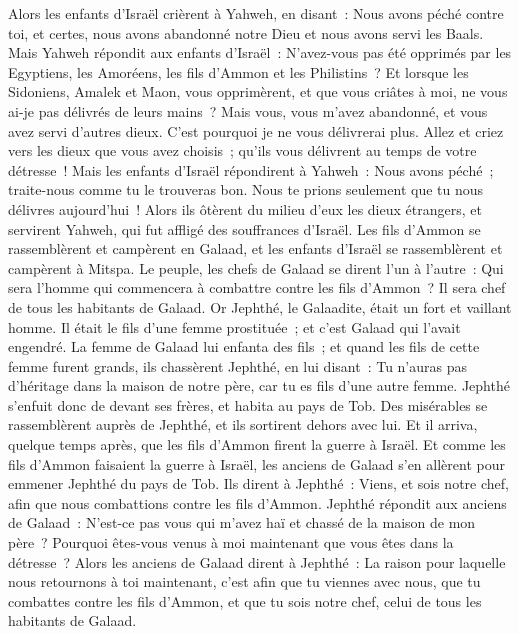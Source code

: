 \begin{multicols}{2}
Alors les enfants d'Israël crièrent à Yahweh, en disant~: Nous avons péché contre toi, et certes, nous avons abandonné notre Dieu et nous avons servi les Baals.
Mais Yahweh répondit aux enfants d'Israël~: N'avez-vous pas été opprimés par les Egyptiens, les Amoréens, les fils d'Ammon et les Philistins~?
Et lorsque les Sidoniens, Amalek et Maon, vous opprimèrent, et que vous criâtes à moi, ne vous ai-je pas délivrés de leurs mains~?
Mais vous, vous m'avez abandonné, et vous avez servi d'autres dieux. C'est pourquoi je ne vous délivrerai plus.
Allez et criez vers les dieux que vous avez choisis~; qu'ils vous délivrent au temps de votre détresse~!
Mais les enfants d'Israël répondirent à Yahweh~: Nous avons péché~; traite-nous comme tu le trouveras bon. Nous te prions seulement que tu nous délivres aujourd'hui~!
Alors ils ôtèrent du milieu d'eux les dieux étrangers, et servirent Yahweh, qui fut affligé des souffrances d'Israël.
Les fils d'Ammon se rassemblèrent et campèrent en Galaad, et les enfants d'Israël se rassemblèrent et campèrent à Mitspa.
Le peuple, les chefs de Galaad se dirent l'un à l'autre~: Qui sera l'homme qui commencera à combattre contre les fils d'Ammon~? Il sera chef de tous les habitants de Galaad.
\VerseOne{}Or Jephthé, le Galaadite, était un fort et vaillant homme. Il était le fils d'une femme prostituée~; et c'est Galaad qui l'avait engendré.
La femme de Galaad lui enfanta des fils~; et quand les fils de cette femme furent grands, ils chassèrent Jephthé, en lui disant~: Tu n'auras pas d'héritage dans la maison de notre père, car tu es fils d'une autre femme.
Jephthé s'enfuit donc de devant ses frères, et habita au pays de Tob. Des misérables se rassemblèrent auprès de Jephthé, et ils sortirent dehors avec lui.
Et il arriva, quelque temps après, que les fils d'Ammon firent la guerre à Israël.
Et comme les fils d'Ammon faisaient la guerre à Israël, les anciens de Galaad s'en allèrent pour emmener Jephthé du pays de Tob.
Ils dirent à Jephthé~: Viens, et sois notre chef, afin que nous combattions contre les fils d'Ammon.
Jephthé répondit aux anciens de Galaad~: N'est-ce pas vous qui m'avez haï et chassé de la maison de mon père~? Pourquoi êtes-vous venus à moi maintenant que vous êtes dans la détresse~?
Alors les anciens de Galaad dirent à Jephthé~: La raison pour laquelle nous retournons à toi maintenant, c'est afin que tu viennes avec nous, que tu combattes contre les fils d'Ammon, et que tu sois notre chef, celui de tous les habitants de Galaad.

\end{multicols}
